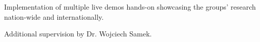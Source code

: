 \documentclass[10pt,a4paper]{article} %
\begin{document}
{{{            Implementation of multiple live demos hands-on showcasing the groups' research nation-wide and internationally.

            \vstep

            Additional supervision by Dr. Wojciech Samek.
        }
    }
}

\end{document}
